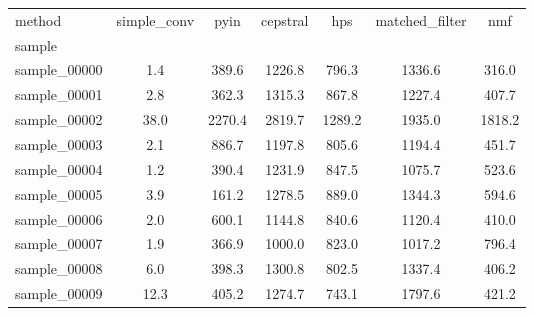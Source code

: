 \begin{tabular}{lcccccc}
\toprule
method & simple\_conv & pyin & cepstral & hps & matched\_filter & nmf \\
sample &  &  &  &  &  &  \\
\midrule
sample\_00000 & 1.4 & 389.6 & 1226.8 & 796.3 & 1336.6 & 316.0 \\
sample\_00001 & 2.8 & 362.3 & 1315.3 & 867.8 & 1227.4 & 407.7 \\
sample\_00002 & 38.0 & 2270.4 & 2819.7 & 1289.2 & 1935.0 & 1818.2 \\
sample\_00003 & 2.1 & 886.7 & 1197.8 & 805.6 & 1194.4 & 451.7 \\
sample\_00004 & 1.2 & 390.4 & 1231.9 & 847.5 & 1075.7 & 523.6 \\
sample\_00005 & 3.9 & 161.2 & 1278.5 & 889.0 & 1344.3 & 594.6 \\
sample\_00006 & 2.0 & 600.1 & 1144.8 & 840.6 & 1120.4 & 410.0 \\
sample\_00007 & 1.9 & 366.9 & 1000.0 & 823.0 & 1017.2 & 796.4 \\
sample\_00008 & 6.0 & 398.3 & 1300.8 & 802.5 & 1337.4 & 406.2 \\
sample\_00009 & 12.3 & 405.2 & 1274.7 & 743.1 & 1797.6 & 421.2 \\
\bottomrule
\end{tabular}
